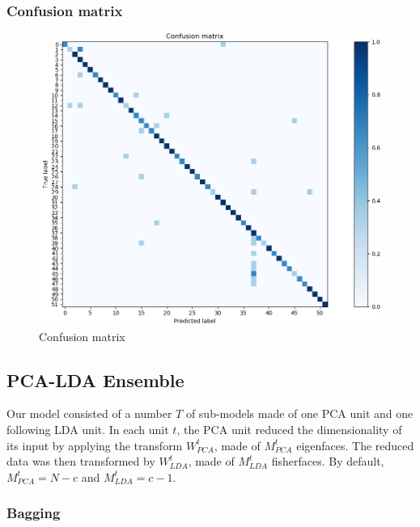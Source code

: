 \documentclass[10pt,technote]{IEEEtran}
\begin{document}
\subsubsection{Confusion matrix}
\begin{figure}[htb!]
    \centering
    \includegraphics[width = \linewidth]{../results/ex2LDA/Figure_1.png}
    \caption{Confusion matrix}
    \label{fig:M_LDA_conf_mat}
\end{figure}

\subsection{PCA-LDA Ensemble}

Our model consisted of a number $T$ of sub-models made of one PCA unit and one following LDA unit. In each unit $t$, the PCA unit reduced the dimensionality of its input by applying the transform $W_{PCA}^t$, made of $M_{PCA}^t$ eigenfaces. The reduced data was then transformed by $W_{LDA}^t$, made of $M_{LDA}^t$ fisherfaces. By default, $M_{PCA}^t = N - c$ and $M_{LDA}^t = c - 1$.

\subsubsection{Bagging}
\end{document}
